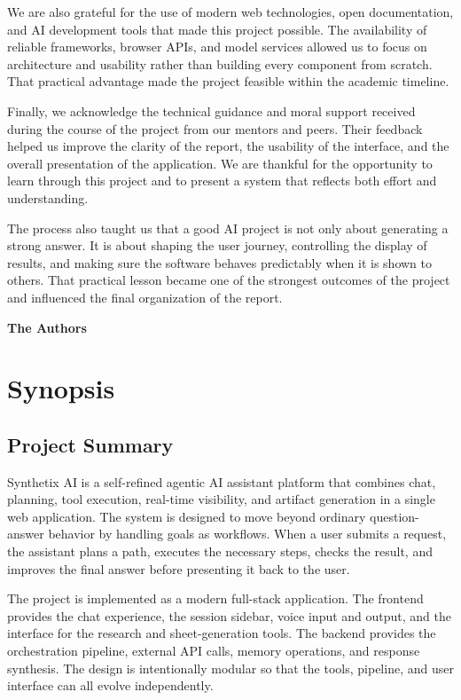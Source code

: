 \documentclass[11pt,oneside]{report}
\newcommand{\ProjectTitle}{Synthetix AI}
\begin{document}
We are also grateful for the use of modern web technologies, open documentation, and AI development tools that made this project possible. The availability of reliable frameworks, browser APIs, and model services allowed us to focus on architecture and usability rather than building every component from scratch. That practical advantage made the project feasible within the academic timeline.

Finally, we acknowledge the technical guidance and moral support received during the course of the project from our mentors and peers. Their feedback helped us improve the clarity of the report, the usability of the interface, and the overall presentation of the application. We are thankful for the opportunity to learn through this project and to present a system that reflects both effort and understanding.

The process also taught us that a good AI project is not only about generating a strong answer. It is about shaping the user journey, controlling the display of results, and making sure the software behaves predictably when it is shown to others. That practical lesson became one of the strongest outcomes of the project and influenced the final organization of the report.

\vfill
\begin{flushright}
\textbf{The Authors}
\end{flushright}

\clearpage
\tableofcontents
\clearpage

\clearpage


\chapter{Synopsis}
\section{Project Summary}
\ProjectTitle{} is a self-refined agentic AI assistant platform that combines chat, planning, tool execution, real-time visibility, and artifact generation in a single web application. The system is designed to move beyond ordinary question-answer behavior by handling goals as workflows. When a user submits a request, the assistant plans a path, executes the necessary steps, checks the result, and improves the final answer before presenting it back to the user.

The project is implemented as a modern full-stack application. The frontend provides the chat experience, the session sidebar, voice input and output, and the interface for the research and sheet-generation tools. The backend provides the orchestration pipeline, external API calls, memory operations, and response synthesis. The design is intentionally modular so that the tools, pipeline, and user interface can all evolve independently.
\end{document}
